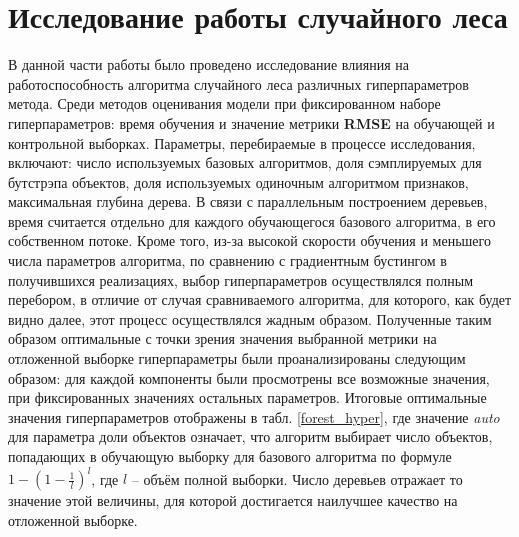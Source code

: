 \documentclass[a4paper, 14pt]{article}
\begin{document}
\section{Исследование работы случайного леса}
    В данной части работы было проведено исследование влияния на работоспособность алгоритма случайного леса различных гиперпараметров метода. Среди методов оценивания модели при фиксированном наборе гиперпараметров: время обучения и значение метрики \textbf{RMSE} на обучающей и контрольной выборках. Параметры, перебираемые в процессе исследования, включают: число используемых базовых алгоритмов, доля сэмплируемых для бутстрэпа объектов, доля используемых одиночным алгоритмом признаков, максимальная глубина дерева. В связи с параллельным построением деревьев, время считается отдельно для каждого обучающегося базового алгоритма, в его собственном потоке. Кроме того, из-за высокой скорости обучения и меньшего числа параметров алгоритма, по сравнению с градиентным бустингом в получившихся реализациях, выбор гиперпараметров осуществлялся полным перебором, в отличие от случая сравниваемого алгоритма, для которого, как будет видно далее, этот процесс осуществлялся жадным образом. Полученные таким образом оптимальные с точки зрения значения выбранной метрики на отложенной выборке гиперпараметры были проанализированы следующим образом: для каждой компоненты были просмотрены все возможные значения, при фиксированных значениях остальных параметров. Итоговые оптимальные значения гиперпараметров отображены в табл. \ref{forest_hyper}, где значение \textit{auto} для параметра доли объектов означает, что алгоритм выбирает число объектов, попадающих в обучающую выборку для базового алгоритма по формуле $1 - (1 - \frac{1}{l})^{l}$, где $l$ -- объём полной выборки. Число деревьев отражает то значение этой величины, для которой достигается наилучшее качество на отложенной выборке.
\end{document}
